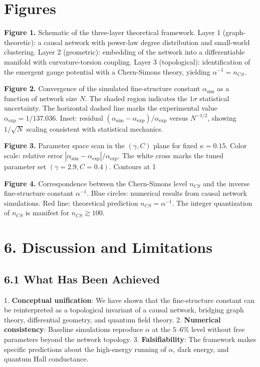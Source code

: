 \documentclass[11pt,a4paper]{article}
\theoremstyle{plain}
\theoremstyle{definition}
\begin{document}
\section{Figures}

\textbf{Figure 1.} Schematic of the three-layer theoretical framework. Layer 1 (graph-theoretic): a causal network with power-law degree distribution and small-world clustering. Layer 2 (geometric): embedding of the network into a differentiable manifold with curvature-torsion coupling. Layer 3 (topological): identification of the emergent gauge potential with a Chern-Simons theory, yielding $\alpha^{-1} = n_{CS}$.

\textbf{Figure 2.} Convergence of the simulated fine-structure constant $\alpha_{\text{sim}}$ as a function of network size $N$. The shaded region indicates the $1\sigma$ statistical uncertainty. The horizontal dashed line marks the experimental value $\alpha_{\text{exp}} = 1/137.036$. Inset: residual $(\alpha_{\text{sim}} - \alpha_{\text{exp}}) / \alpha_{\text{exp}}$ versus $N^{-1/2}$, showing $1/\sqrt{N}$ scaling consistent with statistical mechanics.

\textbf{Figure 3.} Parameter space scan in the $(\gamma, C)$ plane for fixed $\kappa = 0.15$. Color scale: relative error $|\alpha_{\text{sim}} - \alpha_{\text{exp}}| / \alpha_{\text{exp}}$. The white cross marks the tuned parameter set $(\gamma = 2.9, C = 0.4)$. Contours at 1%

\textbf{Figure 4.} Correspondence between the Chern-Simons level $n_{CS}$ and the inverse fine-structure constant $\alpha^{-1}$. Blue circles: numerical results from causal network simulations. Red line: theoretical prediction $n_{CS} = \alpha^{-1}$. The integer quantization of $n_{CS}$ is manifest for $n_{CS} \gtrsim 100$.

\textemdash{}

\section{6. Discussion and Limitations}

\subsection{6.1 What Has Been Achieved}

1. \textbf{Conceptual unification}: We have shown that the fine-structure constant can be reinterpreted as a topological invariant of a causal network, bridging graph theory, differential geometry, and quantum field theory.
2. \textbf{Numerical consistency}: Baseline simulations reproduce $\alpha$ at the $5\text{--}6\%$ level without free parameters beyond the network topology.
3. \textbf{Falsifiability}: The framework makes specific predictions about the high-energy running of $\alpha$, dark energy, and quantum Hall conductance.
\end{document}
